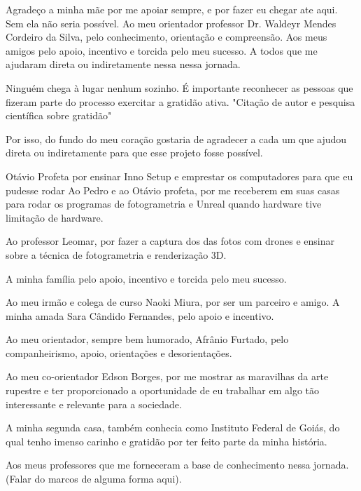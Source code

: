 \lipsum[1-4]

Agradeço a minha mãe por me apoiar sempre, e por fazer eu chegar ate aqui. Sem ela não seria possível.
Ao meu orientador professor Dr. Waldeyr Mendes Cordeiro da Silva, pelo conhecimento, orientação e compreensão.
Aos meus amigos pelo apoio, incentivo e torcida pelo meu sucesso.
A todos que me ajudaram direta ou indiretamente nessa nessa jornada. 


Ninguém chega à lugar nenhum sozinho.
É importante reconhecer as pessoas que fizeram parte do processo
exercitar a gratidão ativa. "Citação de autor e pesquisa científica sobre gratidão"

Por isso, do fundo do meu coração gostaria de agradecer a cada um que ajudou direta ou indiretamente para que esse projeto fosse possível. 

Otávio Profeta por ensinar Inno Setup e emprestar os computadores para que eu pudesse rodar 
Ao Pedro e ao Otávio profeta, por me receberem em suas casas para rodar os programas de fotogrametria e Unreal quando hardware tive limitação de hardware.

Ao professor Leomar, por fazer a captura dos das fotos com drones e ensinar sobre a técnica de fotogrametria e renderização 3D.

A minha família pelo apoio, incentivo e torcida pelo meu sucesso.

Ao meu irmão e colega de curso Naoki Miura, por ser um parceiro e amigo.
A minha amada Sara Cândido Fernandes, pelo apoio e incentivo.

Ao meu orientador, sempre bem humorado, Afrânio Furtado, pelo companheirismo, apoio,  orientações e desorientações.

Ao meu co-orientador Edson Borges, por me mostrar as maravilhas da arte rupestre e ter proporcionado a oportunidade de eu trabalhar em algo tão interessante e relevante para a sociedade.

A minha segunda casa, também conhecia como Instituto Federal de Goiás, do qual tenho imenso carinho e gratidão por ter feito parte da minha história.

Aos meus professores que me forneceram a base de conhecimento nessa jornada. (Falar do marcos de alguma forma aqui).

